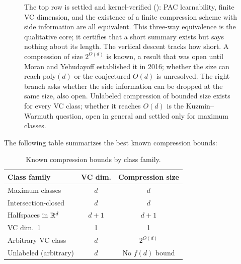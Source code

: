 \begin{figure}[ht]
\caption[Compression and learnability.]{The top row is settled and kernel-verified
  (): PAC learnability, finite VC dimension, and
  the existence of a finite compression scheme with side information are all equivalent.
  This three-way equivalence is the qualitative core; it certifies that a short summary
  exists but says nothing about its length. The vertical descent tracks how short. A
  compression of size $2^{O(d)}$ is known, a result that was open until Moran and
  Yehudayoff established it in 2016; whether the size can reach $\mathrm{poly}(d)$ or
  the conjectured $O(d)$ is unresolved. The right branch asks whether the side information
  can be dropped at the same size, also open. Unlabeled compression of bounded size exists
  for every VC class; whether it reaches $O(d)$ is the Kuzmin--Warmuth question, open in
  general and settled only for maximum classes.}
\label{fig:compression-landscape}
\end{figure}

The following table summarizes the best known compression bounds:

\begin{table}[ht]
\centering\small
\caption{Known compression bounds by class family.}
\label{tab:compression-bounds}
\begin{tabular}{lcc}
\toprule
\textbf{Class family} & \textbf{VC dim.} & \textbf{Compression size} \\
\midrule
Maximum classes & $d$ & $d$ \\
Intersection-closed & $d$ & $d$ \\
Halfspaces in $\mathbb{R}^d$ & $d+1$ & $d+1$ \\
VC dim.\ 1 & 1 & 1 \\
Arbitrary VC class & $d$ & $2^{O(d)}$ \\
Unlabeled (arbitrary) & $d$ & No $f(d)$ bound \\
\bottomrule
\end{tabular}
\end{table}

